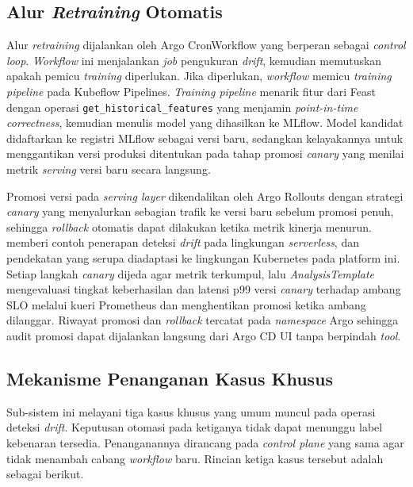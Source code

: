 \subsection{Alur \textit{Retraining} Otomatis}
\label{subsec:retrain}

Alur \textit{retraining} dijalankan oleh Argo CronWorkflow yang berperan sebagai \textit{control loop}. \textit{Workflow} ini menjalankan \textit{job} pengukuran \textit{drift}, kemudian memutuskan apakah pemicu \textit{training} diperlukan. Jika diperlukan, \textit{workflow} memicu \textit{training pipeline} pada Kubeflow Pipelines. \textit{Training pipeline} menarik fitur dari Feast dengan operasi \texttt{get\_historical\_features} yang menjamin \textit{point-in-time correctness}, kemudian menulis model yang dihasilkan ke MLflow. Model kandidat didaftarkan ke registri MLflow sebagai versi baru, sedangkan kelayakannya untuk menggantikan versi produksi ditentukan pada tahap promosi \textit{canary} yang menilai metrik \textit{serving} versi baru secara langsung.

Promosi versi pada \textit{serving layer} dikendalikan oleh Argo Rollouts \autocite{argorollouts2025} dengan strategi \textit{canary} yang menyalurkan sebagian trafik ke versi baru sebelum promosi penuh, sehingga \textit{rollback} otomatis dapat dilakukan ketika metrik kinerja menurun. \textcite{cespedes2024efficient} memberi contoh penerapan deteksi \textit{drift} pada lingkungan \textit{serverless}, dan pendekatan yang serupa diadaptasi ke lingkungan Kubernetes pada platform ini. Setiap langkah \textit{canary} dijeda agar metrik terkumpul, lalu \textit{AnalysisTemplate} mengevaluasi tingkat keberhasilan dan latensi p99 versi \textit{canary} terhadap ambang SLO melalui kueri Prometheus dan menghentikan promosi ketika ambang dilanggar. Riwayat promosi dan \textit{rollback} tercatat pada \textit{namespace} Argo sehingga audit promosi dapat dijalankan langsung dari Argo CD UI tanpa berpindah \textit{tool}.

\subsection{Mekanisme Penanganan Kasus Khusus}
\label{subsec:kasus-khusus}

Sub-sistem ini melayani tiga kasus khusus yang umum muncul pada operasi deteksi \textit{drift}. Keputusan otomasi pada ketiganya tidak dapat menunggu label kebenaran tersedia. Penanganannya dirancang pada \textit{control plane} yang sama agar tidak menambah cabang \textit{workflow} baru. Rincian ketiga kasus tersebut adalah sebagai berikut.

